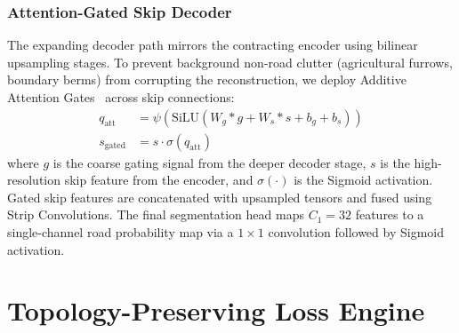 \documentclass[conference]{IEEEtran}
\begin{document}
\subsubsection{Attention-Gated Skip Decoder}
The expanding decoder path mirrors the contracting encoder using bilinear upsampling stages. To prevent background non-road clutter (agricultural furrows, boundary berms) from corrupting the reconstruction, we deploy Additive Attention Gates~\cite{oktay2018attention} across skip connections:
\begin{align}
    q_{\text{att}} &= \psi\left(\text{SiLU}\left(W_g * g + W_s * s + b_g + b_s\right)\right) \\
    s_{\text{gated}} &= s \cdot \sigma(q_{\text{att}})
\end{align}
where $g$ is the coarse gating signal from the deeper decoder stage, $s$ is the high-resolution skip feature from the encoder, and $\sigma(\cdot)$ is the Sigmoid activation. Gated skip features are concatenated with upsampled tensors and fused using Strip Convolutions. The final segmentation head maps $C_1=32$ features to a single-channel road probability map via a $1\times1$ convolution followed by Sigmoid activation.

\section{Topology-Preserving Loss Engine}
\label{sec:loss}
\end{document}
